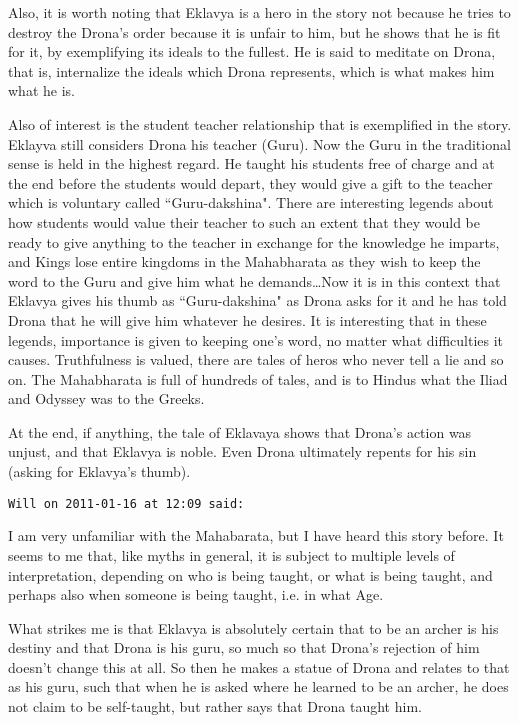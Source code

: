 \begin{footnotesize}
\begin{sffamily}
Also, it is worth noting that Eklavya is a hero in the story not because he tries to destroy the Drona's order because it is unfair to him, but he shows that he is fit for it, by exemplifying its ideals to the fullest. He is said to meditate on Drona, that is, internalize the ideals which Drona represents, which is what makes him what he is.

Also of interest is the student teacher relationship that is exemplified in the story. Eklayva still considers Drona his teacher (Guru). Now the Guru in the traditional sense is held in the highest regard. He taught his students free of charge and at the end before the students would depart, they would give a gift to the teacher which is voluntary called ``Guru-dakshina". There are interesting legends about how students would value their teacher to such an extent that they would be ready to give anything to the teacher in exchange for the knowledge he imparts, and Kings lose entire kingdoms in the Mahabharata as they wish to keep the word to the Guru and give him what he demands…Now it is in this context that Eklavya gives his thumb as ``Guru-dakshina" as Drona asks for it and he has told Drona that he will give him whatever he desires. It is interesting that in these legends, importance is given to keeping one's word, no matter what difficulties it causes. Truthfulness is valued, there are tales of heros who never tell a lie and so on. The Mahabharata is full of hundreds of tales, and is to Hindus what the Iliad and Odyssey was to the Greeks.

At the end, if anything, the tale of Eklavaya shows that Drona's action was unjust, and that Eklavya is noble. Even Drona ultimately repents for his sin (asking for Eklavya's thumb).


\hfill

\texttt{Will on 2011-01-16 at 12:09 said: }

I am very unfamiliar with the Mahabarata, but I have heard this story before. It seems to me that, like myths in general, it is subject to multiple levels of interpretation, depending on who is being taught, or what is being taught, and perhaps also when someone is being taught, i.e. in what Age. 

What strikes me is that Eklavya is absolutely certain that to be an archer is his destiny and that Drona is his guru, so much so that Drona's rejection of him doesn't change this at all. So then he makes a statue of Drona and relates to that as his guru, such that when he is asked where he learned to be an archer, he does not claim to be self-taught, but rather says that Drona taught him. 


\end{sffamily}
\end{footnotesize}

